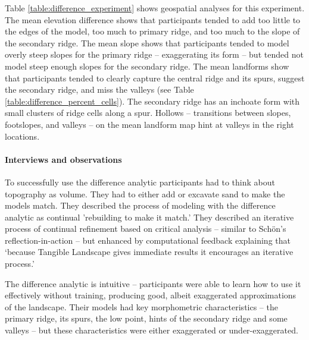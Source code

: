 \documentclass[prodmode,acmtochi]{acmsmall} %
\begin{document}
Table \ref{table:difference_experiment} shows geospatial analyses for this experiment.
%
The mean elevation difference shows that participants tended to add
too little to the edges of the model,
too much to primary ridge,
and too much to the slope of the secondary ridge. 
%
The mean slope shows that participants tended to model 
overly steep slopes for the primary ridge -- exaggerating its form --
but tended not model steep enough slopes for the secondary ridge. 
%
The mean landforms show that participants tended to 
clearly capture the central ridge and its spurs,
suggest the secondary ridge, 
and miss the valleys (see Table \ref{table:difference_percent_cells}). 
The secondary ridge has an inchoate form 
with small clusters of ridge cells along a spur.
Hollows -- transitions between slopes, footslopes, and valleys -- 
on the mean landform map hint at valleys in the right locations.



\paragraph{Interviews and observations}
To successfully use the difference analytic 
participants had to think about topography as volume.
They had to either add or excavate sand to make the models match. 
They described the process of modeling with the difference analytic
as continual 'rebuilding to make it match.'
They described an iterative process of 
continual refinement based on critical analysis 
-- similar to Sch{\"o}n's reflection-in-action --
but enhanced by computational feedback 
explaining that 
`because Tangible Landscape gives immediate results it encourages an iterative process.' 

The difference analytic is intuitive -- 
participants were able to learn how to use it effectively without training, 
producing good, albeit exaggerated approximations of the landscape. 
%
Their models had key morphometric characteristics -- 
the primary ridge, its spurs, the low point, 
hints of the secondary ridge and some valleys -- 
but these characteristics were either exaggerated or under-exaggerated.
\end{document}
